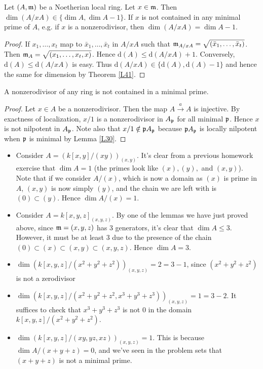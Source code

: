 \documentclass{../mathnotes}
\begin{document}
\begin{lem}
\label{L46}
Let $(A,\mathfrak m)$ be a Noetherian local ring. Let $x\in\mathfrak m$. Then $\dim(A/xA)\in\{\dim A,\dim A-1\}$. If $x$ is not contained in any minimal prime of $A$, e.g. if $x$ is a nonzerodivisor, then $\dim(A/xA)=\dim A-1$.
\end{lem}
\begin{proof}
If $x_1,\ldots,x_t$ map to $\bar x_1,\ldots,\bar x_t$ in $A/xA$ such that $\mathfrak m_{A/xA}=\sqrt{(\bar x_1,\ldots, \bar x_t)}$. Then $\mathfrak m_A=\sqrt{(x_1,\ldots,x_t,x)}$. Hence $\text{d}(A)\leq\text{d}(A/xA)+1$. Conversely, $\text{d}(A)\leq \text{d}(A/xA)$ is easy. Thus $\text{d}(A/xA)\in\{\text{d}(A),\text{d}(A)-1\}$ and hence the same for dimension by Theorem \ref{L41}.
\end{proof}

\begin{lem}
\label{L47}
A nonzerodivisor of any ring is not contained in a minimal prime.
\end{lem}
\begin{proof}
Let $x\in A$ be a nonzerodivisor. Then the map $A\overset{a}{\to}A$ is injective. By exactness of localization, $x/1$ is a nonzerodivisor in $A_\mathfrak p$ for all minimal $\mathfrak p$. Hence $x$ is not nilpotent in $A_\mathfrak p$. Note also that $x/1\notin\mathfrak p A_\mathfrak p$ because $\mathfrak pA_\mathfrak p$ is locally nilpotent when $\mathfrak p$ is minimal by Lemma \ref{L30}.
\end{proof}

\begin{exmp}\hspace{1mm}
\begin{itemize}

\item Consider $A=\left(k[x,y]/(xy)\right)_{(x,y)}$. It's clear from a previous homework exercise that $\dim A=1$ (the primes look like $(x),(y),$ and $(x,y)$). Note that if we consider $A/(x)$, which is now a domain as $(x)$ is prime in $A$, $(x,y)$ is now simply $(y)$, and the chain we are left with is $(0)\subset (y)$. Hence $\dim A/(x)=1$.
\item Consider $A=k[x,y,z]_{(x,y,z)}$. By one of the lemmas we have just proved above, since $\mathfrak m=(x,y,z)$ has 3 generators, it's clear that $\dim A\leq 3$. However, it must be at least 3 due to the presence of the chain $(0)\subset (x)\subset (x,y)\subset (x,y,z)$. Hence $\dim A=3$.

\item $\dim \left(k[x,y,z]/(x^2 + y^2 + z^2) \right)_{(x,y,z)} = 2 = 3-1$, since $(x^2 + y^2 + z^2)$ is not a zerodivisor
\item $\dim \left(k[x,y,z]/(x^2 + y^2 + z^2, x^3 + y^3 + z^3) \right)_{(x,y,z)} = 1 = 3-2$. It suffices to check that $x^3 + y^3 + z^3$ is not $0$ in the domain $k[x,y,z]/(x^2 + y^2 + z^2)$.
\item $\dim \left( k[x,y,z]/(xy, yz, xz) \right)_{(x,y,z)} = 1$. This is because $\dim A/(x+y+z) = 0$, and we've seen in the problem sets that $(x+y+z)$ is not a minimal prime.
\end{itemize}
\end{exmp}
\end{document}
